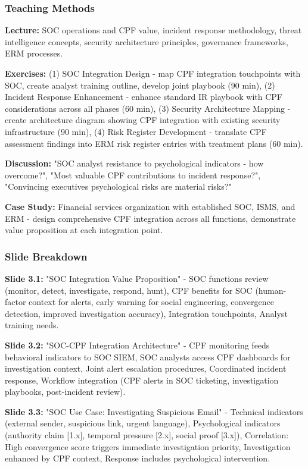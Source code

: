\documentclass[11pt,a4paper]{article}
\begin{document}
\subsubsection{Teaching Methods}

\textbf{Lecture:} SOC operations and CPF value, incident response methodology, threat intelligence concepts, security architecture principles, governance frameworks, ERM processes.

\textbf{Exercises:} (1) SOC Integration Design - map CPF integration touchpoints with SOC, create analyst training outline, develop joint playbook (90 min), (2) Incident Response Enhancement - enhance standard IR playbook with CPF considerations across all phases (60 min), (3) Security Architecture Mapping - create architecture diagram showing CPF integration with existing security infrastructure (90 min), (4) Risk Register Development - translate CPF assessment findings into ERM risk register entries with treatment plans (60 min).

\textbf{Discussion:} "SOC analyst resistance to psychological indicators - how overcome?", "Most valuable CPF contributions to incident response?", "Convincing executives psychological risks are material risks?"

\textbf{Case Study:} Financial services organization with established SOC, ISMS, and ERM - design comprehensive CPF integration across all functions, demonstrate value proposition at each integration point.

\subsubsection{Slide Breakdown}

\textbf{Slide 3.1:} "SOC Integration Value Proposition" - SOC functions review (monitor, detect, investigate, respond, hunt), CPF benefits for SOC (human-factor context for alerts, early warning for social engineering, convergence detection, improved investigation accuracy), Integration touchpoints, Analyst training needs.

\textbf{Slide 3.2:} "SOC-CPF Integration Architecture" - CPF monitoring feeds behavioral indicators to SOC SIEM, SOC analysts access CPF dashboards for investigation context, Joint alert escalation procedures, Coordinated incident response, Workflow integration (CPF alerts in SOC ticketing, investigation playbooks, post-incident review).

\textbf{Slide 3.3:} "SOC Use Case: Investigating Suspicious Email" - Technical indicators (external sender, suspicious link, urgent language), Psychological indicators (authority claim [1.x], temporal pressure [2.x], social proof [3.x]), Correlation: High convergence score triggers immediate investigation priority, Investigation enhanced by CPF context, Response includes psychological intervention.
\end{document}
